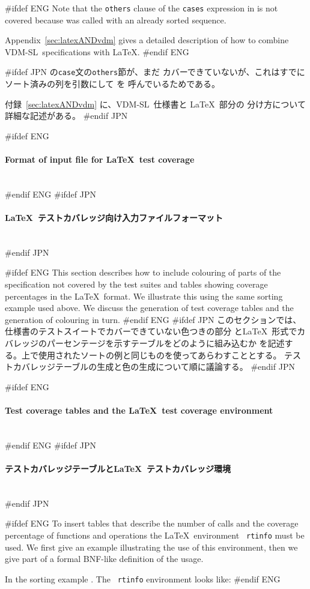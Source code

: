 \documentclass[\pformat,12pt]{article}
\newcommand{\vdmslpp}{VDM-SL}
\newcommand{\vdmslpp}{VDM++}
\newcommand{\subsubsubsection}[1]{\paragraph{#1}\mbox{}\\}
\begin{document}
#ifdef ENG
Note that the {\tt others} clause of the {\tt cases} expression in
 is not covered because
 was
called with an already sorted sequence.

Appendix~\ref{sec:latexANDvdm} gives a detailed description of how to
combine \vdmslpp\ specifications with \LaTeX.
#endif ENG

#ifdef JPN
 の{\tt case}文の{\tt others}節が、まだ
カバーできていないが、これはすでにソート済みの列を引数にして
 を
呼んでいるためである。

付録~\ref{sec:latexANDvdm} に、\vdmslpp\ 仕様書と \LaTeX\ 部分の
分け方について詳細な記述がある。
#endif JPN

#ifdef ENG
\subsubsubsection{Format of input file for \LaTeX\ test coverage}
#endif ENG
#ifdef JPN
\subsubsubsection{\LaTeX\ テストカバレッジ向け入力ファイルフォーマット}
#endif JPN

#ifdef ENG
This section describes how to include colouring of parts of the
specification not covered by the test suites and tables showing
coverage percentages in the \LaTeX\ format. We illustrate this using
the same sorting example used above. We discuss the generation of test
coverage tables and the generation of colouring in turn.
#endif ENG
#ifdef JPN
このセクションでは、仕様書のテストスイートでカバーできていない色つきの部分
と\LaTeX\ 形式でカバレッジのパーセンテージを示すテーブルをどのように組み込むか
を記述する。上で使用されたソートの例と同じものを使ってあらわすこととする。
テストカバレッジテーブルの生成と色の生成について順に議論する。
#endif JPN

#ifdef ENG
\subsubsubsection{Test coverage tables and the \LaTeX\ test coverage environment}
#endif ENG
#ifdef JPN
\subsubsubsection{テストカバレッジテーブルと\LaTeX\ テストカバレッジ環境}
#endif JPN

#ifdef ENG
To insert tables that describe the number of calls and the coverage
percentage of functions and operations the \LaTeX\ environment {\tt
  rtinfo} must be used.  We first give an example illustrating the use
of this environment, then we give part of a formal BNF-like definition
of the usage.

In the sorting example .  The {\tt
  rtinfo} environment looks like:
#endif ENG
\end{document}

